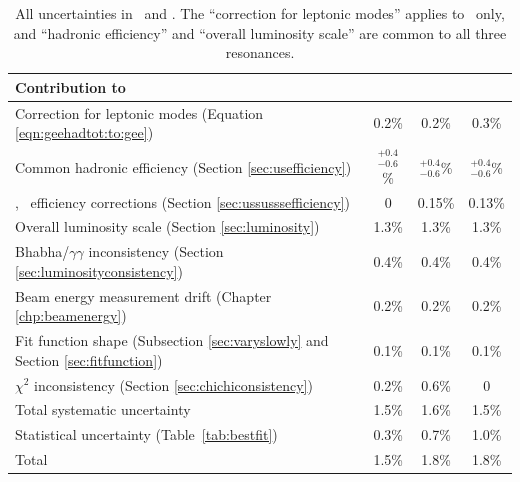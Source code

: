 \documentclass{cornell}
\begin{document}
\begin{table}
  \caption{\label{tab:systematics} All uncertainties in \geehadtot\
  and \gee.  The ``correction for leptonic modes'' applies to \gee\
  only, and ``hadronic efficiency'' and ``overall luminosity scale''
  are common to all three resonances.}
  \begin{center}
    \begin{tabular}{l c c c}
      \hline\hline Contribution to \gee & \hspace{0 cm}\us\hspace{0 cm} & \hspace{0 cm}\uss\hspace{0 cm} & \hspace{0 cm}\usss\hspace{0 cm} \\\hline
      Correction for leptonic modes (Equation \ref{eqn:geehadtot:to:gee})                        & 0.2\%  & 0.2\%  & 0.3\%  \\
      Common hadronic efficiency (Section \ref{sec:usefficiency})                                & $^{+0.4}_{-0.6}$\% & $^{+0.4}_{-0.6}$\% & $^{+0.4}_{-0.6}$\% \\
      \uss, \usss\ efficiency corrections (Section \ref{sec:ussusssefficiency})                  & 0      & 0.15\% & 0.13\% \\
      Overall luminosity scale (Section \ref{sec:luminosity})                                    & 1.3\%  & 1.3\%  & 1.3\%  \\
      Bhabha/$\gamma\gamma$ inconsistency (Section \ref{sec:luminosityconsistency})              & 0.4\%  & 0.4\%  & 0.4\%  \\
      Beam energy measurement drift (Chapter \ref{chp:beamenergy})                               & 0.2\%  & 0.2\%  & 0.2\%  \\
      Fit function shape (Subsection \ref{sec:varyslowly} and Section \ref{sec:fitfunction})     & 0.1\%  & 0.1\%  & 0.1\%  \\
      $\chi^2$ inconsistency (Section \ref{sec:chichiconsistency})                               & 0.2\%  & 0.6\%  & 0      \\\hline
      Total systematic uncertainty                                                               & 1.5\%  & 1.6\%  & 1.5\%  \\
      Statistical uncertainty (Table~\ref{tab:bestfit})                                          & 0.3\%  & 0.7\%  & 1.0\%  \\\hline
      Total                                                                                      & 1.5\%  & 1.8\%  & 1.8\%  \\\hline\hline
    \end{tabular}
  \end{center}
\end{table}
\end{document}
